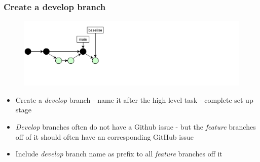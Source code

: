 \documentclass[aspectratio=169]{beamer} %
\begin{document}
\begin{frame}
	\frametitle{Create a develop branch}

	\vspace{-.5cm}
	\begin{minipage}[t][5cm][t]{\textwidth}
		\begin{figure}
			\centering
			\includegraphics[width=\textwidth]{./img/dime-gitflow-network-2-1.png}
		\end{figure}
	\end{minipage}

	\vspace{-.5cm}
	\begin{minipage}[t][5cm][t]{\textwidth}
		\begin{itemize}
			\setlength\itemsep{.5em}
			\item Create a \textit{develop} branch - name it after the high-level task - complete set up stage
			\item \textit{Develop} branches often do not have a Github issue - but the \textit{feature} branches off of it should often have an corresponding GitHub issue
			\item Include \textit{develop} branch name as prefix to all \textit{feature} branches off it
		\end{itemize}
	\end{minipage}
\end{frame}
\end{document}
